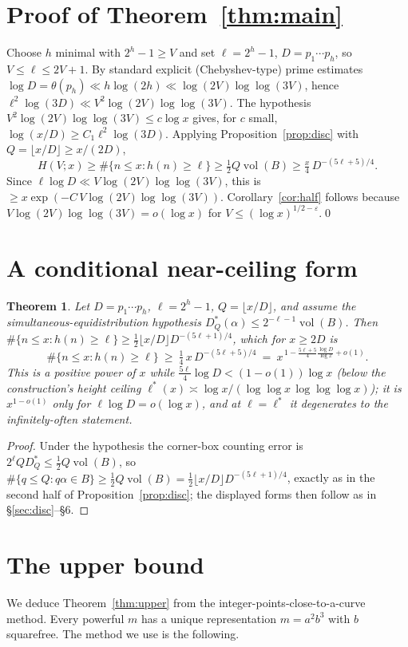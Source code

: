 \documentclass[11pt]{article}
\newtheorem{theorem}{Theorem}
\theoremstyle{definition}
\begin{document}
\section{Proof of Theorem~\ref{thm:main}}
Choose $h$ minimal with $2^h-1\ge V$ and set $\ell=2^h-1$, $D=p_1\cdots p_h$, so $V\le\ell\le2V+1$. By
standard explicit (Chebyshev-type) prime estimates $\log D=\theta(p_h)\ll h\log(2h)\ll\log(2V)\log\log(3V)$,
hence $\ell^2\log(3D)\ll V^2\log(2V)\log\log(3V)$. The hypothesis $V^2\log(2V)\log\log(3V)\le c\log x$ gives,
for $c$ small, $\log(x/D)\ge C_1\ell^2\log(3D)$. Applying Proposition~\ref{prop:disc} with
$Q=\lfloor x/D\rfloor\ge x/(2D)$,
\[
  H(V;x)\ge\#\{n\le x:h(n)\ge\ell\}\ge\tfrac12 Q\operatorname{vol}(B)\ge\tfrac{x}{4}\,D^{-(5\ell+5)/4}.
\]
Since $\ell\log D\ll V\log(2V)\log\log(3V)$, this is $\ge x\exp(-C\,V\log(2V)\log\log(3V))$.
Corollary~\ref{cor:half} follows because $V\log(2V)\log\log(3V)=o(\log x)$ for
$V\le(\log x)^{1/2-\varepsilon}$.\qed

\section{A conditional near-ceiling form}
\begin{theorem}\label{thm:cond}
Let $D=p_1\cdots p_h$, $\ell=2^h-1$, $Q=\lfloor x/D\rfloor$, and assume the simultaneous-equidistribution
hypothesis $D_Q^\ast(\alpha)\le2^{-\ell-1}\operatorname{vol}(B)$. Then $\#\{n\le x:h(n)\ge\ell\}\ge
\tfrac12\lfloor x/D\rfloor D^{-(5\ell+1)/4}$, which for $x\ge2D$ is
\[
  \#\{n\le x:h(n)\ge\ell\}\ \ge\ \tfrac14\,x\,D^{-(5\ell+5)/4}\ =\ x^{\,1-\frac{5\ell+5}{4}\frac{\log D}{\log x}+o(1)}.
\]
This is a positive power of $x$ while $\tfrac{5\ell}{4}\log D<(1-o(1))\log x$ (below the construction's height
ceiling $\ell^\ast(x)\asymp\log x/(\log\log x\,\log\log\log x)$); it is $x^{1-o(1)}$ only for
$\ell\log D=o(\log x)$, and at $\ell=\ell^\ast$ it degenerates to the infinitely-often statement.
\end{theorem}
\begin{proof}
Under the hypothesis the corner-box counting error is $2^\ell QD_Q^\ast\le\tfrac12Q\operatorname{vol}(B)$, so
$\#\{q\le Q:q\alpha\in B\}\ge\tfrac12Q\operatorname{vol}(B)=\tfrac12\lfloor x/D\rfloor D^{-(5\ell+1)/4}$, exactly as
in the second half of Proposition~\ref{prop:disc}; the displayed forms then follow as in \S\ref{sec:disc}--\S6.
\end{proof}

\section{The upper bound}\label{sec:upper}
We deduce Theorem~\ref{thm:upper} from the integer-points-close-to-a-curve method. Every powerful $m$ has a
unique representation $m=a^2b^3$ with $b$ squarefree. The method we use is the following.
\end{document}
